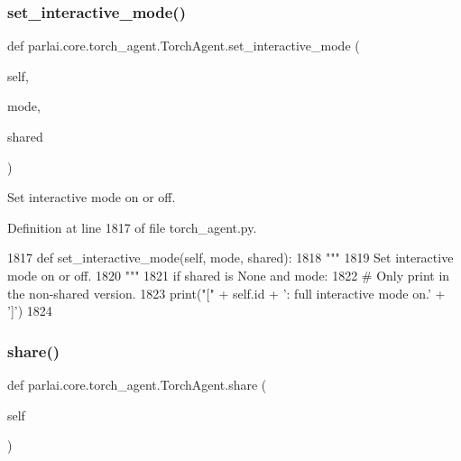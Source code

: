 \subsubsection{\texorpdfstring{set\+\_\+interactive\+\_\+mode()}{set\_interactive\_mode()}}
{\footnotesize\ttfamily def parlai.\+core.\+torch\+\_\+agent.\+Torch\+Agent.\+set\+\_\+interactive\+\_\+mode (\begin{DoxyParamCaption}\item[{}]{self,  }\item[{}]{mode,  }\item[{}]{shared }\end{DoxyParamCaption})}

\begin{DoxyVerb}Set interactive mode on or off.
\end{DoxyVerb}
 

Definition at line 1817 of file torch\+\_\+agent.\+py.


\begin{DoxyCode}
1817     \textcolor{keyword}{def }set\_interactive\_mode(self, mode, shared):
1818         \textcolor{stringliteral}{"""}
1819 \textcolor{stringliteral}{        Set interactive mode on or off.}
1820 \textcolor{stringliteral}{        """}
1821         \textcolor{keywordflow}{if} shared \textcolor{keywordflow}{is} \textcolor{keywordtype}{None} \textcolor{keywordflow}{and} mode:
1822             \textcolor{comment}{# Only print in the non-shared version.}
1823             print(\textcolor{stringliteral}{"["} + self.id + \textcolor{stringliteral}{': full interactive mode on.'} + \textcolor{stringliteral}{']'})
1824 
\end{DoxyCode}
\mbox{\label{classparlai_1_1core_1_1torch__agent_1_1TorchAgent_a373f0e276bf7c9d914a4e3363e9c2712}} 
\subsubsection{\texorpdfstring{share()}{share()}}
{\footnotesize\ttfamily def parlai.\+core.\+torch\+\_\+agent.\+Torch\+Agent.\+share (\begin{DoxyParamCaption}\item[{}]{self }\end{DoxyParamCaption})}

